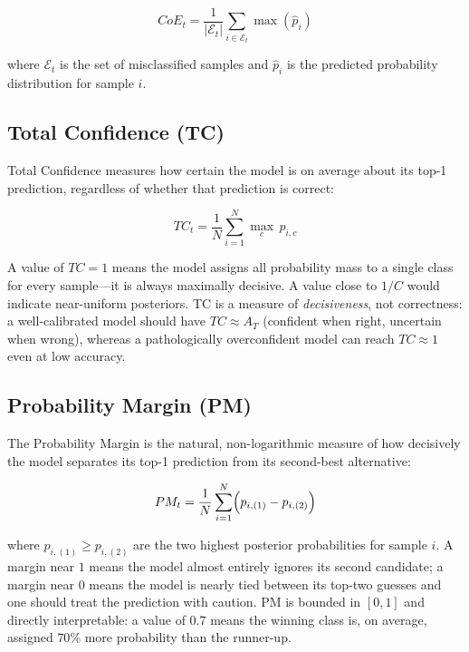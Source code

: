 \begin{equation}
	CoE_t = \frac{1}{|\mathcal{E}_t|} \sum_{i \in \mathcal{E}_t} \max(\hat{p}_i)
\end{equation}

where $\mathcal{E}_t$ is the set of misclassified samples and $\hat{p}_i$ is the predicted probability distribution for sample $i$.

\subsection{Total Confidence (TC)}

Total Confidence measures how certain the model is on average about its top-1 prediction, regardless of whether that prediction is correct:

\begin{equation}
	TC_t = \frac{1}{N} \sum_{i=1}^{N} \max_{c} \, p_{i,c}
\end{equation}

A value of $TC=1$ means the model assigns all probability mass to a single class for every sample---it is always maximally decisive. A value close to $1/C$ would indicate near-uniform posteriors. TC is a measure of \emph{decisiveness}, not correctness: a well-calibrated model should have $TC \approx A_T$ (confident when right, uncertain when wrong), whereas a pathologically overconfident model can reach $TC \approx 1$ even at low accuracy.

\subsection{Probability Margin (PM)}

The Probability Margin is the natural, non-logarithmic measure of how decisively the model separates its top-1 prediction from its second-best alternative:

\begin{equation}
	PM_t = \frac{1}{N} \sum_{i=1}^{N} \Bigl( p_{i,(1)} - p_{i,(2)} \Bigr)
\end{equation}

where $p_{i,(1)} \ge p_{i,(2)}$ are the two highest posterior probabilities for sample $i$. A margin near $1$ means the model almost entirely ignores its second candidate; a margin near $0$ means the model is nearly tied between its top-two guesses and one should treat the prediction with caution. PM is bounded in $[0,1]$ and directly interpretable: a value of $0.7$ means the winning class is, on average, assigned $70\%$ more probability than the runner-up.


